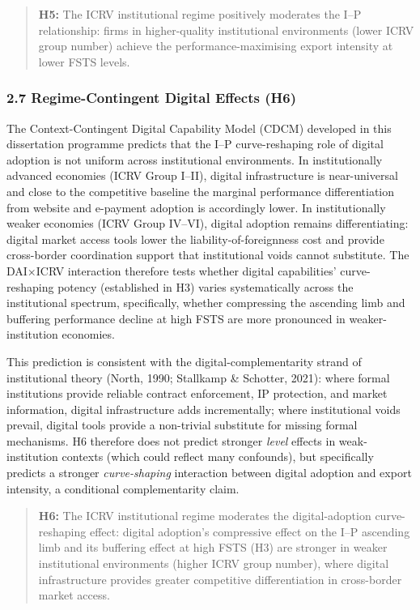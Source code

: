 \documentclass[
  12pt,a4paper]{article}
\begin{document}
\begin{quote}
\textbf{H5:} The ICRV institutional regime positively moderates the I--P
relationship: firms in higher-quality institutional environments (lower
ICRV group number) achieve the performance-maximising export intensity
at lower FSTS levels.
\end{quote}

\hypertarget{regime-contingent-digital-effects-h6}{%
\subsubsection{2.7 Regime-Contingent Digital Effects
(H6)}\label{regime-contingent-digital-effects-h6}}

The Context-Contingent Digital Capability Model (CDCM) developed in this
dissertation programme predicts that the I--P curve-reshaping role of
digital adoption is not uniform across institutional environments. In
institutionally advanced economies (ICRV Group I--II), digital
infrastructure is near-universal and close to the competitive baseline
the marginal performance differentiation from website and e-payment
adoption is accordingly lower. In institutionally weaker economies (ICRV
Group IV--VI), digital adoption remains differentiating: digital market
access tools lower the liability-of-foreignness cost and provide
cross-border coordination support that institutional voids cannot
substitute. The DAI×ICRV interaction therefore tests whether digital
capabilities' curve-reshaping potency (established in H3) varies
systematically across the institutional spectrum, specifically, whether
compressing the ascending limb and buffering performance decline at high
FSTS are more pronounced in weaker-institution economies.

This prediction is consistent with the digital-complementarity strand of
institutional theory (North, 1990; Stallkamp \& Schotter, 2021): where
formal institutions provide reliable contract enforcement, IP
protection, and market information, digital infrastructure adds
incrementally; where institutional voids prevail, digital tools provide
a non-trivial substitute for missing formal mechanisms. H6 therefore
does not predict stronger \emph{level} effects in weak-institution
contexts (which could reflect many confounds), but specifically predicts
a stronger \emph{curve-shaping} interaction between digital adoption and
export intensity, a conditional complementarity claim.

\begin{quote}
\textbf{H6:} The ICRV institutional regime moderates the
digital-adoption curve-reshaping effect: digital adoption's compressive
effect on the I--P ascending limb and its buffering effect at high FSTS
(H3) are stronger in weaker institutional environments (higher ICRV
group number), where digital infrastructure provides greater competitive
differentiation in cross-border market access.
\end{quote}
\end{document}
